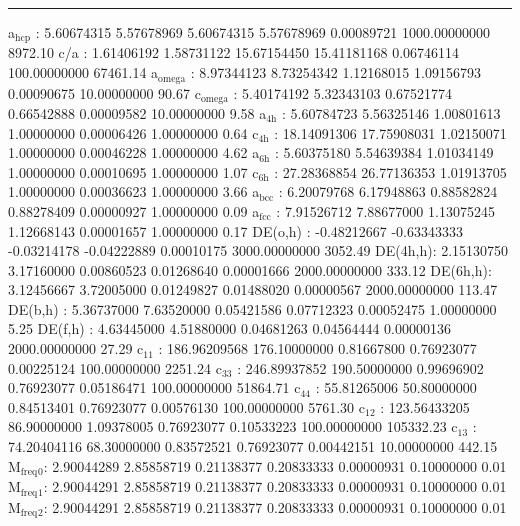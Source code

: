 \documentclass[11pt]{article}
\begin{document}
\noindent\rule{\textwidth}{0.5pt}
a\(_{\text{hcp}}\)   :   5.60674315   5.57678969   5.60674315   5.57678969   0.00089721 1000.00000000      8972.10
c/a     :   1.61406192   1.58731122  15.67154450  15.41181168   0.06746114 100.00000000     67461.14
a\(_{\text{omega}}\) :   8.97344123   8.73254342   1.12168015   1.09156793   0.00090675  10.00000000        90.67
c\(_{\text{omega}}\) :   5.40174192   5.32343103   0.67521774   0.66542888   0.00009582  10.00000000         9.58
a\(_{\text{4h}}\)    :   5.60784723   5.56325146   1.00801613   1.00000000   0.00006426   1.00000000         0.64
c\(_{\text{4h}}\)    :  18.14091306  17.75908031   1.02150071   1.00000000   0.00046228   1.00000000         4.62
a\(_{\text{6h}}\)    :   5.60375180   5.54639384   1.01034149   1.00000000   0.00010695   1.00000000         1.07
c\(_{\text{6h}}\)    :  27.28368854  26.77136353   1.01913705   1.00000000   0.00036623   1.00000000         3.66
a\(_{\text{bcc}}\)   :   6.20079768   6.17948863   0.88582824   0.88278409   0.00000927   1.00000000         0.09
a\(_{\text{fcc}}\)   :   7.91526712   7.88677000   1.13075245   1.12668143   0.00001657   1.00000000         0.17
DE(o,h) :  -0.48212667  -0.63343333  -0.03214178  -0.04222889   0.00010175 3000.00000000      3052.49
DE(4h,h):   2.15130750   3.17160000   0.00860523   0.01268640   0.00001666 2000.00000000       333.12
DE(6h,h):   3.12456667   3.72005000   0.01249827   0.01488020   0.00000567 2000.00000000       113.47
DE(b,h) :   5.36737000   7.63520000   0.05421586   0.07712323   0.00052475   1.00000000         5.25
DE(f,h) :   4.63445000   4.51880000   0.04681263   0.04564444   0.00000136 2000.00000000        27.29
c\(_{\text{11}}\)    : 186.96209568 176.10000000   0.81667800   0.76923077   0.00225124 100.00000000      2251.24
c\(_{\text{33}}\)    : 246.89937852 190.50000000   0.99696902   0.76923077   0.05186471 100.00000000     51864.71
c\(_{\text{44}}\)    :  55.81265006  50.80000000   0.84513401   0.76923077   0.00576130 100.00000000      5761.30
c\(_{\text{12}}\)    : 123.56433205  86.90000000   1.09378005   0.76923077   0.10533223 100.00000000    105332.23
c\(_{\text{13}}\)    :  74.20404116  68.30000000   0.83572521   0.76923077   0.00442151  10.00000000       442.15
M\(_{\text{freq}}\)\(_{\text{0}}\):   2.90044289   2.85858719   0.21138377   0.20833333   0.00000931   0.10000000         0.01
M\(_{\text{freq}}\)\(_{\text{1}}\):   2.90044291   2.85858719   0.21138377   0.20833333   0.00000931   0.10000000         0.01
M\(_{\text{freq}}\)\(_{\text{2}}\):   2.90044291   2.85858719   0.21138377   0.20833333   0.00000931   0.10000000         0.01
\end{document}
